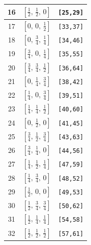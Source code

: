 \documentclass[fleqn,8pt]{jsarticle}
\begin{document}
\begin{longtable}{ccc}
16 & $\left[ \frac{1}{2},\, \frac{1}{2},\, 0 \right]$ & {\tt [25,29]} \\ \hline
17 & $\left[ 0,\, 0,\, \frac{1}{2} \right]$ & {\tt [33,37]} \\ \hline
18 & $\left[ 0,\, \frac{3}{4},\, \frac{1}{4} \right]$ & {\tt [34,46]} \\ \hline
19 & $\left[ \frac{3}{4},\, 0,\, \frac{1}{4} \right]$ & {\tt [35,55]} \\ \hline
20 & $\left[ \frac{3}{4},\, \frac{3}{4},\, \frac{1}{2} \right]$ & {\tt [36,64]} \\ \hline
21 & $\left[ 0,\, \frac{1}{4},\, \frac{3}{4} \right]$ & {\tt [38,42]} \\ \hline
22 & $\left[ \frac{1}{4},\, 0,\, \frac{3}{4} \right]$ & {\tt [39,51]} \\ \hline
23 & $\left[ \frac{1}{4},\, \frac{1}{4},\, \frac{1}{2} \right]$ & {\tt [40,60]} \\ \hline
24 & $\left[ 0,\, \frac{1}{2},\, 0 \right]$ & {\tt [41,45]} \\ \hline
25 & $\left[ \frac{3}{4},\, \frac{1}{2},\, \frac{3}{4} \right]$ & {\tt [43,63]} \\ \hline
26 & $\left[ \frac{3}{4},\, \frac{1}{4},\, 0 \right]$ & {\tt [44,56]} \\ \hline
27 & $\left[ \frac{1}{4},\, \frac{1}{2},\, \frac{1}{4} \right]$ & {\tt [47,59]} \\ \hline
28 & $\left[ \frac{1}{4},\, \frac{3}{4},\, 0 \right]$ & {\tt [48,52]} \\ \hline
29 & $\left[ \frac{1}{2},\, 0,\, 0 \right]$ & {\tt [49,53]} \\ \hline
30 & $\left[ \frac{1}{2},\, \frac{3}{4},\, \frac{3}{4} \right]$ & {\tt [50,62]} \\ \hline
31 & $\left[ \frac{1}{2},\, \frac{1}{4},\, \frac{1}{4} \right]$ & {\tt [54,58]} \\ \hline
32 & $\left[ \frac{1}{2},\, \frac{1}{2},\, \frac{1}{2} \right]$ & {\tt [57,61]} \\
\end{longtable}
\renewcommand{\arraystretch}{1.2}
\end{document}
